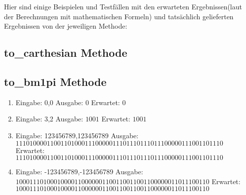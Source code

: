 \documentclass[course=erap]{aspdoc}
\begin{document}
Hier sind einige Beispielen und Testfällen mit den erwarteten Ergebnissen(laut der Berechnungen mit mathematischen Formeln) und tatsächlich gelieferten Ergebnissen von der jeweiligen Methode:
\subsection{to\_carthesian Methode}


\subsection{to\_bm1pi Methode}
\begin{enumerate}[label=\roman*)]
\item Eingabe: 0,0 \quad  Ausgabe: $0$ \quad Erwartet: $0$
\item Eingabe: 3,2 \quad Ausgabe: $1001$ \quad Erwartet: $1001$
\item Eingabe: 123456789,123456789 \newline Ausgabe: $111010000110011010001110000011101110111011100000111001101110
$ \newline Erwartet: $111010000110011010001110000011101110111011100000111001101110
$
\item Eingabe: -123456789,-123456789 \newline Ausgabe: $10001110100010000110000001100110011001100000011011100110
$ \newline Erwartet: 
$10001110100010000110000001100110011001100000011011100110
$
\end{enumerate}
\end{document}

